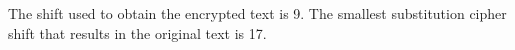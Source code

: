 The shift used to obtain the encrypted text is 9. The smallest substitution cipher shift that results in the original text is 17.
